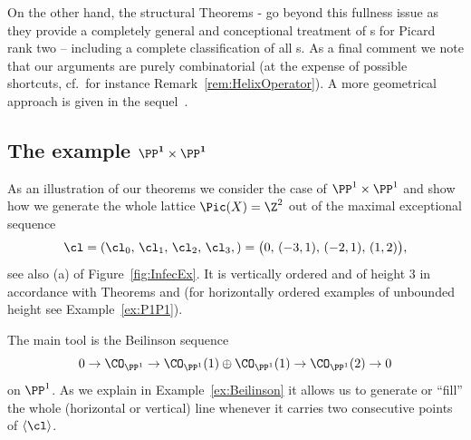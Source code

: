 {On the other hand, the structural Theorems {\thLex}-{\thFull} 
go beyond this fullness issue as they provide a completely general 
and conceptional treatment of \mes s for Picard rank two
-- including a complete classification of all \mes s}. As a final 
comment we note that our arguments are purely
combinatorial (at the expense of possible shortcuts, cf.\ 
for instance Remark~\ref{rem:HelixOperator}). 
A more geometrical approach is given 
in the sequel~\cite{exsec}.

\subsection{The example \texorpdfstring{$\mathbf{\PP^1\times\PP^1}$}{P1 x P1}}
\label{subsec:GenDerCat}
As an illustration of our theorems we consider the case of
$\PP^1\times\PP^1$ and show how we generate the 
whole lattice $\Pic(X)=\Z^2$ out of the maximal 
exceptional sequence 
$$
\cl=(\cl_0,\,\cl_1,\,\cl_2,\,\cl_3,)=
\big(0,\,(-3,1),\,(-2,1),\,(1,2)\big),
$$
see also (a) of Figure~\ref{fig:InfecEx}. It 
is vertically ordered and of height $3$ in 
accordance with Theorems {\thLex} and {\thHeight} 
(for horizontally ordered examples of unbounded 
height see Example~\ref{ex:P1P1}).

The main tool is the Beilinson sequence
$$
0\to\CO_{\PP^1}\to\CO_{\PP^1}(1)\oplus\CO_{\PP^1}(1)
\to\CO_{\PP^1}(2)\to0
$$
on $\PP^1$. As we explain in Example~\ref{ex:Beilinson}
it allows us to generate or ``fill'' the whole 
(horizontal or vertical) line whenever it carries two 
consecutive points of $\langle\cl\rangle$.

